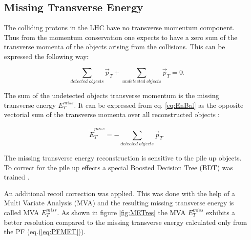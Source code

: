 \subsection{Missing Transverse Energy}

The colliding protons in the LHC have no transverse momentum component. Thus from the momentum conservation one expects to have a zero sum of the transverse momenta of the 
objects arising from the collisions. This can be expressed the following way:

\begin{equation}\label{eq:EnBal}
 \sum_{detected\; objects} \vec{p}_{T} + \sum_{undetected\; objects} \vec{p}_{T} = 0.
\end{equation}

The sum of the undetected objects transverse momentum is the missing transverse energy $E_{T}^{miss}$.
It can be expressed from eq. \ref{eq:EnBal} as the opposite vectorial sum of the transverse momenta over all reconstructed objects \cite{CMS-PAS-PFT-09-001}:

\begin{equation}\label{eq:PFMET}
 \vec{E}^{miss}_{T} = - \sum_{detected\; objects} \vec{p}_{T}.
\end{equation}


The missing transverse energy reconstruction is sensitive to the pile up objects. To correct for the 
pile up effects a special Boosted Decision Tree (BDT) was trained \cite{CMS-PAS-JME-12-002}.

An additional recoil correction\cite{TWikiMET} was applied. This was done with the help of a 
Multi Variate Analysis (MVA) and the resulting missing transverse energy is called MVA $E_{T}^{miss}$.
As shown in figure \ref{fig:METres} the MVA $E_{T}^{miss}$ exhibits a better resolution compared to the 
missing transverse energy calculated only from the PF (eq.(\ref{eq:PFMET})).

